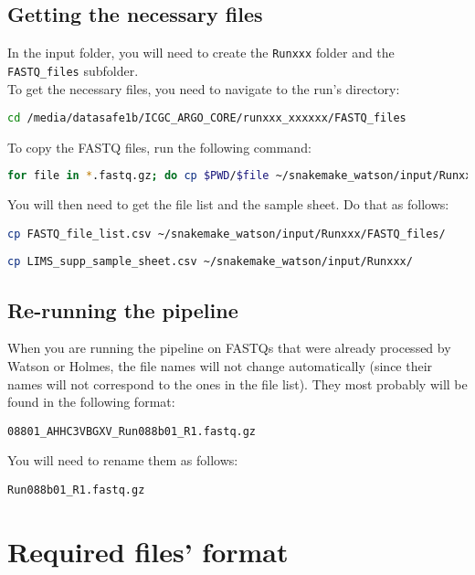 \subsection{Getting the necessary files}
In the input folder, you will need to create the \texttt{Runxxx} folder and the \texttt{FASTQ\_files} subfolder.\\

To get the necessary files, you need to navigate to the run's directory:
\begin{center}
    \lstinline[language=bash]{cd /media/datasafe1b/ICGC_ARGO_CORE/runxxx_xxxxxx/FASTQ_files}
\end{center}

To copy the FASTQ files, run the following command:

\begin{lstlisting}[breaklines=true, language=bash]
for file in *.fastq.gz; do cp $PWD/$file ~/snakemake_watson/input/Runxxx/FASTQ_files/$file; done
\end{lstlisting}


You will then need to get the file list and the sample sheet. Do that as follows:
\begin{center}
    \lstinline[language=bash]{cp FASTQ_file_list.csv ~/snakemake_watson/input/Runxxx/FASTQ_files/}

    \lstinline[language=bash]{cp LIMS_supp_sample_sheet.csv ~/snakemake_watson/input/Runxxx/}
\end{center}

\subsection{Re-running the pipeline}
When you are running the pipeline on FASTQs that were already processed by Watson or Holmes, the file names will not change automatically (since their names will not correspond to the ones in the file list). They most probably will be found in the following format:

\begin{center}
    \texttt{08801\_AHHC3VBGXV\_Run088b01\_R1.fastq.gz}
\end{center}

You will need to rename them as follows:

\begin{center}
    \texttt{Run088b01\_R1.fastq.gz}
\end{center}

\section{Required files' format}
